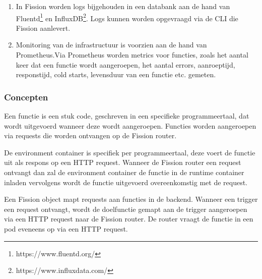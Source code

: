 \begin{enumerate}
    \item In Fission worden logs bijgehouden in een databank aan de hand van Fluentd\footnote{https://www.fluentd.org/} en InfluxDB\footnote{https://www.influxdata.com/}. Logs kunnen worden opgevraagd via de CLI die Fission aanlevert.
    \item Monitoring van de infrastructuur is voorzien aan de hand van Prometheus.Via Prometheus worden metrics voor functies, zoals het aantal keer dat een functie wordt aangeroepen, het aantal errors, aanroeptijd, responstijd, cold starts, levensduur van een functie etc. gemeten.
\end{enumerate}

\subsubsection{Concepten}
\begin{description}[style=unboxed, labelwidth=\linewidth, listparindent =0pt]
    \item[Functie]
    Een functie is een stuk code, geschreven in een specifieke programmeertaal, dat wordt uitgevoerd wanneer deze wordt aangeroepen. Functies worden aangeroepen via requests die worden ontvangen op de Fission router. \autocite{Fission2018}
    \\
    
    \item[Environment]
    De environment container is specifiek per programmeertaal, deze voert de functie uit als respons op een HTTP request. Wanneer de Fission router een request ontvangt dan zal de environment container de functie in de runtime container inladen vervolgens wordt de functie uitgevoerd overeenkomstig met de request. \autocite{Fission2018}
    \\
    
    \item[Trigger]
    Een Fission object mapt requests aan functies in de backend. Wanneer een trigger een request ontvangt, wordt de doelfunctie gemapt aan de trigger aangeroepen via een HTTP request naar de Fission router. De router vraagt de functie in een pod eveneens op via een HTTP request. \autocite{Fission2018}
    \\
\end{description}

\newpage
